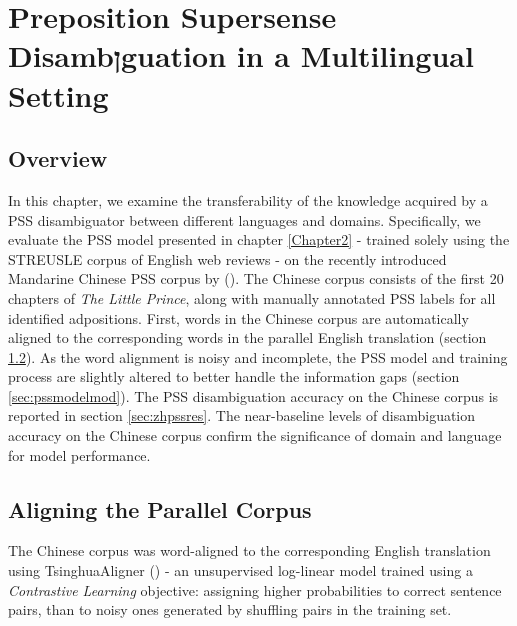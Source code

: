 
\chapter{Preposition Supersense Disambןguation in a Multilingual Setting } %

\label{Chapter4} %

\section{Overview}

In this chapter, we examine the transferability of the knowledge acquired by a PSS disambiguator between different languages and domains. Specifically, we evaluate the PSS model presented in chapter \ref{Chapter2} - trained solely using the STREUSLE corpus of English web reviews - on the recently introduced Mandarine Chinese PSS corpus by (\cite{chinesecorpus}). The Chinese corpus consists of the first 20 chapters of \textit{The Little Prince}, along with manually annotated PSS labels for all identified adpositions. First, words in the Chinese corpus are automatically aligned to the corresponding words in the parallel English translation (section \ref{sec:chinesecorpus}). As the word alignment is noisy and incomplete, the PSS model and training process are slightly altered to better handle the information gaps (section \ref{sec:pssmodelmod}). The PSS disambiguation accuracy on the Chinese corpus is reported in section \ref{sec:zhpssres}. The near-baseline levels of disambiguation accuracy on the Chinese corpus confirm the significance of domain and language for model performance.

\section{Aligning the Parallel Corpus} \label{sec:chinesecorpus}

The Chinese corpus was word-aligned to the corresponding English translation using TsinghuaAligner (\cite{liu2014contrastive}) - an unsupervised log-linear model trained using a \textit{Contrastive Learning} objective: assigning higher probabilities to correct sentence pairs, than to noisy ones generated by shuffling pairs in the training set. 

